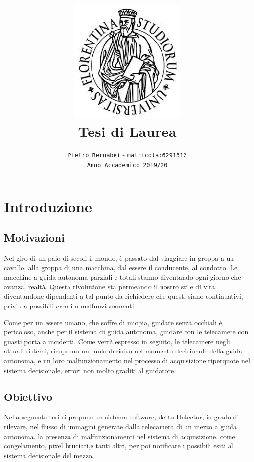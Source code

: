 \documentclass[14pt]{extarticle}
\begin{document}
\title{\includegraphics{download.jpeg} \vspace{2cm} \textbf{\\Tesi di Laurea}}

\author{\texttt{Pietro Bernabei} - \texttt{matricola:6291312}\\ \texttt{Anno Accademico 2019/20}}
\date{}
\maketitle
\newpage
\tableofcontents

\newpage
\section{Introduzione}
\subsection{Motivazioni}
Nel giro di un paio di secoli il mondo, è passato dal viaggiare in groppa a un cavallo, alla groppa di una macchina, dal essere il conducente, al condotto. Le macchine a guida autonoma parziali e totali stanno diventando ogni giorno che avanza, realtà. Questa rivoluzione sta permeando il nostro stile di vita, diventandone dipendenti a tal punto da richiedere che questi siano continuativi, privi da possibili errori o malfunzionamenti.

Come per un essere umano, che soffre di miopia, guidare senza occhiali è pericoloso, anche per il sistema di guida autonoma, guidare con le telecamere con guasti porta a incidenti.
Come verrà espresso in seguito, le telecamere negli attuali sistemi, ricoprono un ruolo decisivo nel momento decisionale della guida autonoma, e un loro malfunzionamento nel processo di acquisizione riperquote nel sistema decisionale, errori non molto graditi al guidatore.
\subsection{Obiettivo}
Nella seguente tesi si propone un sistema software, detto Detector, in grado di rilevare, nel flusso di immagini generate dalla telecamera di un mezzo a guida autonoma, la presenza di malfunzionamenti nel sistema di acquisizione, come congelamento, pixel bruciati,e tanti altri, per poi notificare i possibili esiti al sistema  decisionale del mezzo.
\end{document}

